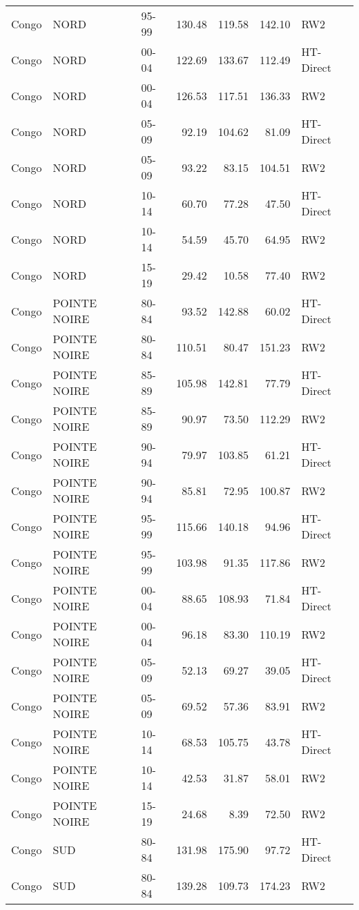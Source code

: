 \begin{longtable}{lllrrrl}
  Congo & NORD & 95-99 & 130.48 & 119.58 & 142.10 & RW2 \\ 
  Congo & NORD & 00-04 & 122.69 & 133.67 & 112.49 & HT-Direct \\ 
  Congo & NORD & 00-04 & 126.53 & 117.51 & 136.33 & RW2 \\ 
  Congo & NORD & 05-09 & 92.19 & 104.62 & 81.09 & HT-Direct \\ 
  Congo & NORD & 05-09 & 93.22 & 83.15 & 104.51 & RW2 \\ 
  Congo & NORD & 10-14 & 60.70 & 77.28 & 47.50 & HT-Direct \\ 
  Congo & NORD & 10-14 & 54.59 & 45.70 & 64.95 & RW2 \\ 
  Congo & NORD & 15-19 & 29.42 & 10.58 & 77.40 & RW2 \\ 
  Congo & POINTE NOIRE & 80-84 & 93.52 & 142.88 & 60.02 & HT-Direct \\ 
  Congo & POINTE NOIRE & 80-84 & 110.51 & 80.47 & 151.23 & RW2 \\ 
  Congo & POINTE NOIRE & 85-89 & 105.98 & 142.81 & 77.79 & HT-Direct \\ 
  Congo & POINTE NOIRE & 85-89 & 90.97 & 73.50 & 112.29 & RW2 \\ 
  Congo & POINTE NOIRE & 90-94 & 79.97 & 103.85 & 61.21 & HT-Direct \\ 
  Congo & POINTE NOIRE & 90-94 & 85.81 & 72.95 & 100.87 & RW2 \\ 
  Congo & POINTE NOIRE & 95-99 & 115.66 & 140.18 & 94.96 & HT-Direct \\ 
  Congo & POINTE NOIRE & 95-99 & 103.98 & 91.35 & 117.86 & RW2 \\ 
  Congo & POINTE NOIRE & 00-04 & 88.65 & 108.93 & 71.84 & HT-Direct \\ 
  Congo & POINTE NOIRE & 00-04 & 96.18 & 83.30 & 110.19 & RW2 \\ 
  Congo & POINTE NOIRE & 05-09 & 52.13 & 69.27 & 39.05 & HT-Direct \\ 
  Congo & POINTE NOIRE & 05-09 & 69.52 & 57.36 & 83.91 & RW2 \\ 
  Congo & POINTE NOIRE & 10-14 & 68.53 & 105.75 & 43.78 & HT-Direct \\ 
  Congo & POINTE NOIRE & 10-14 & 42.53 & 31.87 & 58.01 & RW2 \\ 
  Congo & POINTE NOIRE & 15-19 & 24.68 & 8.39 & 72.50 & RW2 \\ 
  Congo & SUD & 80-84 & 131.98 & 175.90 & 97.72 & HT-Direct \\ 
  Congo & SUD & 80-84 & 139.28 & 109.73 & 174.23 & RW2 \\ 

\end{longtable}
